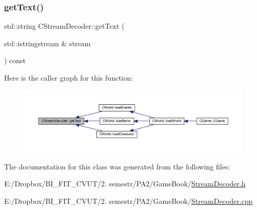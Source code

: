 \subsubsection{\texorpdfstring{get\+Text()}{getText()}}
{\footnotesize\ttfamily std\+::string C\+Stream\+Decoder\+::get\+Text (\begin{DoxyParamCaption}\item[{std\+::istringstream \&}]{stream }\end{DoxyParamCaption}) const}

Here is the caller graph for this function\+:\nopagebreak
\begin{figure}[H]
\begin{center}
\leavevmode
\includegraphics[width=350pt]{class_c_stream_decoder_a4ddd62e9d414ff656f5708e3c0c39b36_icgraph}
\end{center}
\end{figure}


The documentation for this class was generated from the following files\+:\begin{DoxyCompactItemize}
\item 
E\+:/\+Dropbox/\+B\+I\+\_\+\+F\+I\+T\+\_\+\+C\+V\+U\+T/2. semestr/\+P\+A2/\+Game\+Book/\mbox{\hyperlink{_stream_decoder_8h}{Stream\+Decoder.\+h}}\item 
E\+:/\+Dropbox/\+B\+I\+\_\+\+F\+I\+T\+\_\+\+C\+V\+U\+T/2. semestr/\+P\+A2/\+Game\+Book/\mbox{\hyperlink{_stream_decoder_8cpp}{Stream\+Decoder.\+cpp}}\end{DoxyCompactItemize}
